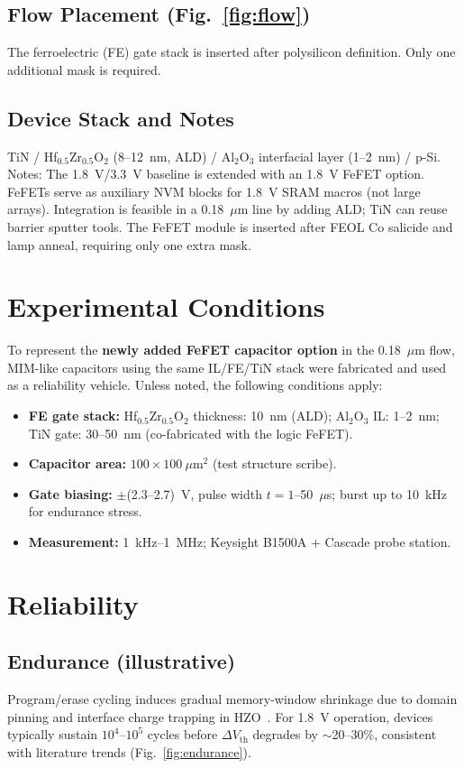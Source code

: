 \documentclass[conference]{IEEEtran}
\begin{document}
\subsection{Flow Placement (Fig.~\ref{fig:flow})}
The ferroelectric (FE) gate stack is inserted after polysilicon definition. Only one additional mask is required.

\subsection{Device Stack and Notes}
TiN / Hf$_{0.5}$Zr$_{0.5}$O$_2$ (8--12~nm, ALD) / Al$_2$O$_3$ interfacial layer (1--2~nm) / p-Si. Notes: The 1.8~V/3.3~V baseline is extended with an 1.8~V FeFET option. FeFETs serve as auxiliary NVM blocks for 1.8~V SRAM macros (not large arrays). Integration is feasible in a 0.18~$\mu$m line by adding ALD; TiN can reuse barrier sputter tools. The FeFET module is inserted after FEOL Co salicide and lamp anneal, requiring only one extra mask.

\section{Experimental Conditions}
To represent the \textbf{newly added FeFET capacitor option} in the 0.18~$\mu$m flow, MIM-like capacitors using the same IL/FE/TiN stack were fabricated and used as a reliability vehicle. Unless noted, the following conditions apply:
\begin{itemize}
  \item \textbf{FE gate stack:} Hf$_{0.5}$Zr$_{0.5}$O$_2$ thickness: 10~nm (ALD); Al$_2$O$_3$ IL: 1--2~nm; TiN gate: 30--50~nm (co-fabricated with the logic FeFET).
  \item \textbf{Capacitor area:} $100 \times 100~\mu$m$^2$ (test structure scribe).
  \item \textbf{Gate biasing:} $\pm$(2.3--2.7)~V, pulse width $t = 1$--50~$\mu$s; burst up to 10~kHz for endurance stress.
  \item \textbf{Measurement:} 1~kHz--1~MHz; Keysight B1500A + Cascade probe station.
\end{itemize}

\section{Reliability}
\subsection{Endurance (illustrative)}
Program/erase cycling induces gradual memory-window shrinkage due to domain pinning and interface charge trapping in HZO~\cite{Boscke2011,Mueller2012}. For 1.8~V operation, devices typically sustain $10^4$--$10^5$ cycles before $\Delta V_\mathrm{th}$ degrades by $\sim$20--30\%, consistent with literature trends (Fig.~\ref{fig:endurance}).
\end{document}
